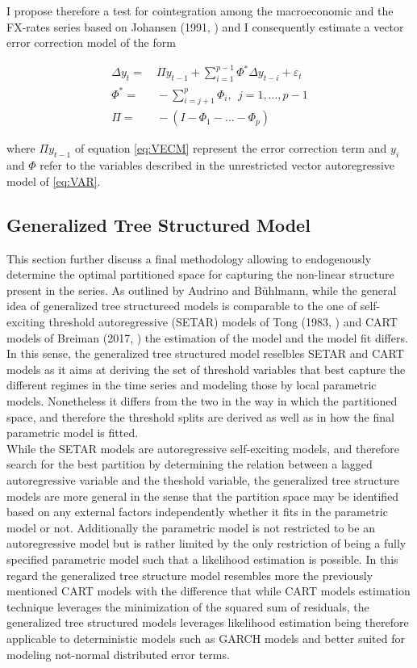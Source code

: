 I propose therefore a test for cointegration among the macroeconomic
and the FX-rates series based on Johansen (1991,
\cite{Johansen}) %
and I consequently estimate a vector error correction model of the
form

\begin{align}
  \Delta y_t =& \ \Pi y_{t-1} + \sum^{p-1}_{i=1} \Phi^{*} \Delta y_{t-i} + \varepsilon_t \nonumber\\
  \Phi^{*} =& \ - \sum^{p}_{i=j+1} \Phi_i, \ \  j = 1, \dots, p-1 \label{eq:VECM}\\
  \Pi =& \ -(I - \Phi_1 - \dots - \Phi_p) \nonumber\
\end{align}

where $\Pi y_{t-1}$ of equation \ref{eq:VECM} represent the error
correction term and $y_i$ and $\Phi$ refer to the variables described
in the unrestricted vector autoregressive model of \ref{eq:VAR}.

\subsection{Generalized Tree Structured Model}
\label{sub:GTS}

This section further discuss a final methodology allowing to
endogenously determine the optimal partitioned space for capturing the
non-linear structure present in the series. As outlined by Audrino and
B{\"u}hlmann, while the general idea of generalized tree structureed
models is comparable to the one of self-exciting threshold
autoregressive (SETAR) models of Tong (1983, \cite{SETAR_Tong}) and
CART models of Breiman (2017, \cite{Breiman}) the estimation of the
model and the model fit differs. In this sense, the generalized tree
structured model reselbles SETAR and CART models as it aims at
deriving the set of threshold variables that best capture the
different regimes in the time series and modeling those by local
parametric models. Nonetheless it differs from the two in the way in
which the partitioned space, and therefore the threshold splits are
derived as well as in how the final parametric model is
fitted.\\
While the SETAR models are autoregressive self-exciting models, and
therefore search for the best partition by determining the relation
between a lagged autoregressive variable and the theshold variable,
the generalized tree structure models are more general in the sense
that the partition space may be identified based on any external
factors independently whether it fits in the parametric model or
not. Additionally the parametric model is not restricted to be an
autoregressive model but is rather limited by the only restriction of
being a fully specified parametric model such that a likelihood
estimation is possible. In this regard the generalized tree structure
model resembles more the previously mentioned CART models with the
difference that while CART models estimation technique leverages the
minimization of the squared sum of residuals, the generalized tree
structured models leverages likelihood estimation being therefore
applicable to deterministic models such as GARCH models and better
suited for modeling not-normal distributed error terms.


